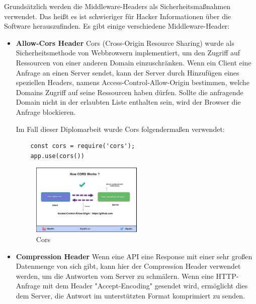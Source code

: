 Grundsätzlich werden die Middleware-Headers als Sicherheitsmaßnahmen verwendet. Das heißt es ist schwieriger für Hacker Informationen über die Software herauszufinden. Es gibt einige verschiedene Middleware-Header:

\begin{itemize}
    \item \textbf{Allow-Cors Header}
        \newline
        Cors (Cross-Origin Resource Sharing) wurde als Sicherheitsmethode von Webbrowsern implementiert, um den Zugriff auf Ressourcen von einer anderen Domain einzuschränken. Wenn ein Client eine Anfrage an einen Server sendet, kann der Server durch Hinzufügen eines speziellen Headers, namens Access-Control-Allow-Origin bestimmen, welche Domains Zugriff auf seine Ressourcen haben dürfen. Sollte die anfragende Domain nicht in der erlaubten Liste enthalten sein, wird der Browser die Anfrage blockieren.

        Im Fall dieser Diplomarbeit wurde Cors folgendermaßen verwendet:

\begin{lstlisting}
    const cors = require('cors');
    app.use(cors())
\end{lstlisting}
                
\begin{figure}[h]
    \centering
    \includegraphics[width=0.5\textwidth]{pics/cors.png}
    \caption{Cors}
    \label{fig:mesh1}
\end{figure}

        \cite{Cors}
    \item \textbf{Compression Header}
        \newline
        Wenn eine API eine Response mit einer sehr großen Datenmenge von sich gibt, kann hier der Compression Header verwendet werden, um die Antworten vom Server zu schmälern. Wenn eine HTTP-Anfrage mit dem Header "Accept-Encoding" gesendet wird, ermöglicht dies dem Server, die Antwort im unterstützten Format komprimiert zu senden.


\end{itemize}
